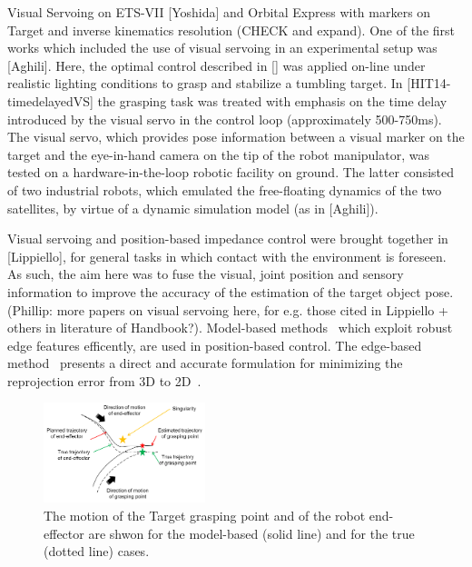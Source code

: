 Visual Servoing on ETS-VII [Yoshida] and Orbital Express with markers on Target and inverse kinematics resolution (CHECK and expand). One of the first works which included the use of visual servoing in an experimental setup was [Aghili]. Here, the optimal control described in [] was applied on-line under realistic lighting conditions to grasp and stabilize a tumbling target. In [HIT14-timedelayedVS] the grasping task was treated with emphasis on the time delay introduced by the visual servo in the control loop (approximately 500-750ms). The visual servo, which provides pose information between a visual marker on the target and the eye-in-hand camera on the tip of the robot manipulator, was tested on a hardware-in-the-loop robotic facility on ground. The latter consisted of two industrial robots, which emulated the free-floating dynamics of the two satellites, by virtue of a dynamic simulation model (as in [Aghili]). 

Visual servoing and position-based impedance control were brought together in [Lippiello], for general tasks in which contact with the environment is foreseen. As such, the aim here was to fuse the visual, joint position and sensory information to improve the accuracy of the estimation of the target object pose. (Phillip: more papers on visual servoing here, for e.g. those cited in Lippiello + others in literature of Handbook?). Model-based methods~\cite{Comport2004, Drummond2002} which exploit robust edge features efficently, are used in position-based control. The edge-based method~\cite{Drummond2002} presents a direct and accurate formulation for minimizing the reprojection error from 3D to 2D~\cite{Oumer2015}. 
%
%
%
%
%
\begin{figure}[t!]
\centering\includegraphics[angle=0,width=0.42\textwidth]{./figures/Motivation_Image}
\caption{The motion of the Target grasping point and of the robot end-effector are shwon for the model-based (solid line) and for the true (dotted line) cases.}
\label{fig:motivation}
\end{figure}
%
